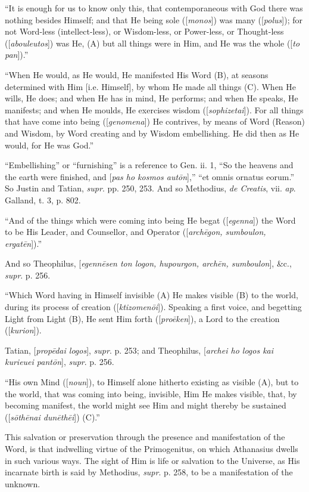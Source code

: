 ``It is enough for us to know only this, that contemporaneous
with God there was nothing besides Himself; and that He being sole ([\emph{monos}])
was many ([\emph{polus}]); for not Word-less (intellect-less), or
Wisdom-less, or Power-less, or Thought-less ([\emph{abouleutos}]) was
He, (A) but all things were in Him, and He was the whole ([\emph{to pan}]).''

``When He would, as He would, He manifested His Word (B), at
seasons determined with Him [i.e. Himself], by whom He made all things
(C). When He wills, He does; and when He has in mind, He performs; and
when He speaks, He manifests; and when He moulds, He exercises wisdom
([\emph{sophizetai}]). For all things that have come into being ([\emph{genomena}])
He contrives, by means of Word (Reason) and Wisdom, by Word creating
and by Wisdom embellishing. He did then as He would, for He was
God.''

``Embellishing'' or ``furnishing'' is a reference
to Gen. ii. 1, ``So the heavens and the earth were finished, and [\emph{pas
ho kosmos aut\={o}n}],'' ``et omnis ornatus eorum.''
So Justin and Tatian, \emph{supr}. pp. 250, 253. And so Methodius, \emph{de
Creatis}, vii. \emph{ap}. Galland, t. 3, p. 802.

``And of the things which were coming into being He begat ([\emph{egenna}])
the Word to be His Leader, and Counsellor, and Operator ([\emph{arch\={e}gon,
sumboulon, ergat\={e}n}]).''

And so Theophilus, [\emph{egenn\={e}sen ton logon, hupourgon, arch\={e}n,
sumboulon}], \&c., \emph{supr}. p. 256.

``Which Word having in Himself invisible (A) He makes visible
(B) to the world, during its process of creation ([\emph{ktizomen\={o}i}]).
Speaking a first voice, and begetting Light from Light (B), He sent
Him forth ([\emph{pro\={e}ken}]), a Lord to the creation ([\emph{kurion}]).

Tatian, [\emph{prop\={e}dai logos}], \emph{supr}. p. 253; and
Theophilus, [\emph{archei ho logos kai kurieuei pant\={o}n}], \emph{supr}.
p. 256.

``His own Mind ([\emph{noun}]), to Himself alone hitherto
existing as visible (A), but to the world, that was coming into being,
invisible, Him He makes visible, that, by becoming manifest, the
world might see Him and might thereby be sustained ([\emph{s\={o}th\={e}nai
dun\={e}th\={e}i}]) (C).''

This salvation or preservation through the presence and
manifestation of the Word, is that indwelling virtue of the
Primogenitus, on which Athanasius dwells in such various ways. The
sight of Him is life or salvation to the Universe, as His incarnate
birth is said by Methodius, \emph{supr}. p. 258, to be a manifestation
of the unknown.

